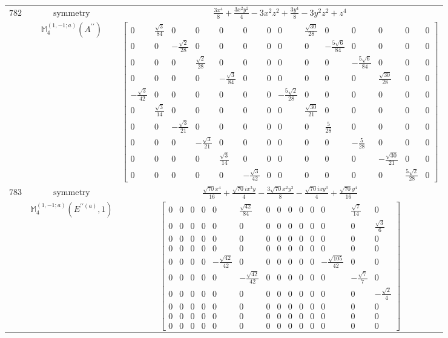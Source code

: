 \documentclass[fleqn,8pt,landscape]{jsarticle}
\begin{document}
\begin{longtable}{ccc}
$ 782 $ & $ \text{symmetry} $ & $ \frac{3 x^{4}}{8} + \frac{3 x^{2} y^{2}}{4} - 3 x^{2} z^{2} + \frac{3 y^{4}}{8} - 3 y^{2} z^{2} + z^{4} $ \\
$  $ & $ \mathbb{M}_{4}^{(1,-1;a)}(A^{\prime\prime}) $ & $ \begin{bmatrix} 0 & \frac{\sqrt{3}}{84} & 0 & 0 & 0 & 0 & 0 & 0 & \frac{\sqrt{30}}{28} & 0 & 0 & 0 & 0 & 0 \\ 0 & 0 & - \frac{\sqrt{2}}{28} & 0 & 0 & 0 & 0 & 0 & 0 & - \frac{5 \sqrt{6}}{84} & 0 & 0 & 0 & 0 \\ 0 & 0 & 0 & \frac{\sqrt{2}}{28} & 0 & 0 & 0 & 0 & 0 & 0 & - \frac{5 \sqrt{6}}{84} & 0 & 0 & 0 \\ 0 & 0 & 0 & 0 & - \frac{\sqrt{3}}{84} & 0 & 0 & 0 & 0 & 0 & 0 & \frac{\sqrt{30}}{28} & 0 & 0 \\ - \frac{\sqrt{3}}{42} & 0 & 0 & 0 & 0 & 0 & 0 & - \frac{5 \sqrt{2}}{28} & 0 & 0 & 0 & 0 & 0 & 0 \\ 0 & \frac{\sqrt{3}}{14} & 0 & 0 & 0 & 0 & 0 & 0 & \frac{\sqrt{30}}{21} & 0 & 0 & 0 & 0 & 0 \\ 0 & 0 & - \frac{\sqrt{3}}{21} & 0 & 0 & 0 & 0 & 0 & 0 & \frac{5}{28} & 0 & 0 & 0 & 0 \\ 0 & 0 & 0 & - \frac{\sqrt{3}}{21} & 0 & 0 & 0 & 0 & 0 & 0 & - \frac{5}{28} & 0 & 0 & 0 \\ 0 & 0 & 0 & 0 & \frac{\sqrt{3}}{14} & 0 & 0 & 0 & 0 & 0 & 0 & - \frac{\sqrt{30}}{21} & 0 & 0 \\ 0 & 0 & 0 & 0 & 0 & - \frac{\sqrt{3}}{42} & 0 & 0 & 0 & 0 & 0 & 0 & \frac{5 \sqrt{2}}{28} & 0 \end{bmatrix} $ \\ \hline
$ 783 $ & $ \text{symmetry} $ & $ \frac{\sqrt{70} x^{4}}{16} + \frac{\sqrt{70} i x^{3} y}{4} - \frac{3 \sqrt{70} x^{2} y^{2}}{8} - \frac{\sqrt{70} i x y^{3}}{4} + \frac{\sqrt{70} y^{4}}{16} $ \\
$  $ & $ \mathbb{M}_{4}^{(1,-1;a)}(E^{\prime\prime(a)},1) $ & $ \begin{bmatrix} 0 & 0 & 0 & 0 & 0 & \frac{\sqrt{42}}{84} & 0 & 0 & 0 & 0 & 0 & 0 & \frac{\sqrt{7}}{14} & 0 \\ 0 & 0 & 0 & 0 & 0 & 0 & 0 & 0 & 0 & 0 & 0 & 0 & 0 & \frac{\sqrt{3}}{6} \\ 0 & 0 & 0 & 0 & 0 & 0 & 0 & 0 & 0 & 0 & 0 & 0 & 0 & 0 \\ 0 & 0 & 0 & 0 & 0 & 0 & 0 & 0 & 0 & 0 & 0 & 0 & 0 & 0 \\ 0 & 0 & 0 & 0 & - \frac{\sqrt{42}}{42} & 0 & 0 & 0 & 0 & 0 & 0 & - \frac{\sqrt{105}}{42} & 0 & 0 \\ 0 & 0 & 0 & 0 & 0 & - \frac{\sqrt{42}}{42} & 0 & 0 & 0 & 0 & 0 & 0 & - \frac{\sqrt{7}}{7} & 0 \\ 0 & 0 & 0 & 0 & 0 & 0 & 0 & 0 & 0 & 0 & 0 & 0 & 0 & - \frac{\sqrt{2}}{4} \\ 0 & 0 & 0 & 0 & 0 & 0 & 0 & 0 & 0 & 0 & 0 & 0 & 0 & 0 \\ 0 & 0 & 0 & 0 & 0 & 0 & 0 & 0 & 0 & 0 & 0 & 0 & 0 & 0 \\ 0 & 0 & 0 & 0 & 0 & 0 & 0 & 0 & 0 & 0 & 0 & 0 & 0 & 0 \end{bmatrix} $ \\ \hline

\end{longtable}
\end{document}
